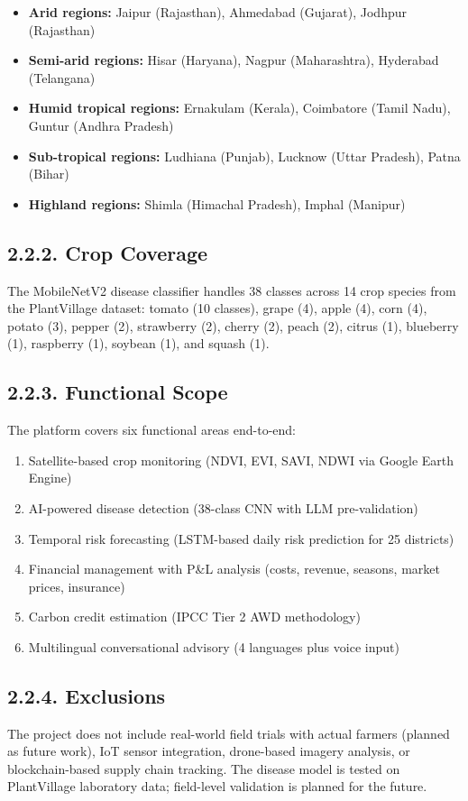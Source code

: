 \documentclass[12pt, a4paper]{report}
\begin{document}
\begin{itemize}[leftmargin=*]
  \item \textbf{Arid regions:} Jaipur (Rajasthan), Ahmedabad (Gujarat), Jodhpur (Rajasthan)
  \item \textbf{Semi-arid regions:} Hisar (Haryana), Nagpur (Maharashtra), Hyderabad (Telangana)
  \item \textbf{Humid tropical regions:} Ernakulam (Kerala), Coimbatore (Tamil Nadu), Guntur (Andhra Pradesh)
  \item \textbf{Sub-tropical regions:} Ludhiana (Punjab), Lucknow (Uttar Pradesh), Patna (Bihar)
  \item \textbf{Highland regions:} Shimla (Himachal Pradesh), Imphal (Manipur)
\end{itemize}
\subsection{2.2.2. Crop Coverage}
The MobileNetV2 disease classifier handles 38 classes across 14 crop species from the PlantVillage dataset: tomato (10 classes), grape (4), apple (4), corn (4), potato (3), pepper (2), strawberry (2), cherry (2), peach (2), citrus (1), blueberry (1), raspberry (1), soybean (1), and squash (1).

\subsection{2.2.3. Functional Scope}
The platform covers six functional areas end-to-end:

\begin{enumerate}[leftmargin=*]
  \item Satellite-based crop monitoring (NDVI, EVI, SAVI, NDWI via Google Earth Engine)
  \item AI-powered disease detection (38-class CNN with LLM pre-validation)
  \item Temporal risk forecasting (LSTM-based daily risk prediction for 25 districts)
  \item Financial management with P\&L analysis (costs, revenue, seasons, market prices, insurance)
  \item Carbon credit estimation (IPCC Tier 2 AWD methodology)
  \item Multilingual conversational advisory (4 languages plus voice input)
\end{enumerate}
\subsection{2.2.4. Exclusions}
The project does not include real-world field trials with actual farmers (planned as future work), IoT sensor integration, drone-based imagery analysis, or blockchain-based supply chain tracking. The disease model is tested on PlantVillage laboratory data; field-level validation is planned for the future.
\end{document}

